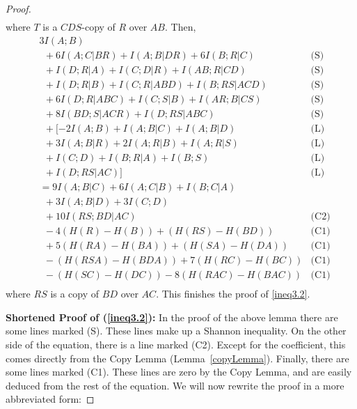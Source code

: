 \documentclass[10pt,journal]{IEEEtran}
\begin{document}
\begin{proof}
\begin{align*}
\end{align*}
where $T$ is a $CDS$-copy of $R$ over $AB$.  Then,
\begin{align*}
    &  3I(A;B) &\\
       &\ \ + 6I(A;C|BR)
      + I(A;B|DR)
      + 6I(B;R|C)                                                          & \text{(S)}\\
       &\ \ + I(D;R|A)
      + I(C;D|R)
      + I(AB;R|CD)                                                         & \text{(S)}\\
       &\ \ + I(D;R|B)
      + I(C;R|ABD)
      + I(B;RS|ACD)                                                        & \text{(S)}\\
       &\ \ + 6I(D;R|ABC)
      + I(C;S|B)
      + I(AR;B|CS)                                                         & \text{(S)}\\
       &\ \ + 8I(BD;S|ACR)
      + I(D;RS|ABC)                                                        & \text{(S)}\\
       &\ \ + [-2I(A;B)+I(A;B|C)+I(A;B|D) & \text{(L)}\\
       &\ \ +3I(A;B|R)+2I(A;R|B)+I(A;R|S) & \text{(L)}\\
       &\ \ +I(C;D)+I(B;R|A)+I(B;S)       & \text{(L)}\\
       &\ \ +I(D;RS|AC)]                                   & \text{(L)}\\
   &= 9I(A;B|C)+6I(A;C|B)+I(B;C|A)\\
     &\ \ +3I(A;B|D)+3I(C;D) \\
      &\ \ + 10I(RS;BD|AC)                                                    & \text{(C2)} \\
      &\ \ - 4(H(R)-H(B))
      + (H(RS)-H(BD))               & \text{(C1)}\\
       &\ \ + 5(H(RA)-H(BA))
       + (H(SA)-H(DA))               & \text{(C1)}\\
      &\ \ - (H(RSA)-H(BDA))
      + 7(H(RC)-H(BC))               & \text{(C1)}\\
      &\ \ - (H(SC)-H(DC))
      - 8(H(RAC)-H(BAC))                                                  & \text{(C1)}\\
\end{align*}
where $RS$ is a copy of $BD$ over $AC$.
This finishes the proof of \eqref{ineq3.2}.

{\bf Shortened Proof of (\ref{ineq3.2}):}
In the proof of the above lemma there are some lines marked (S).
These lines make up a Shannon inequality.
On the other side of the equation, there is a line marked (C2).  Except for the coefficient,
this comes directly from the Copy Lemma (Lemma~\ref{copyLemma}).  Finally, there are some lines
marked (C1).  These lines are zero by the Copy Lemma, and are easily deduced from the rest of the
equation.  We will now rewrite the proof in a more abbreviated form:


\end{proof}
\end{document}
